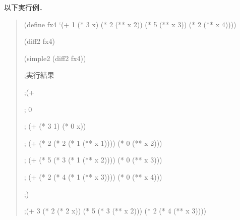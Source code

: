 以下実行例．
\begin{quote}
  
  (define fx4 `(+ 1 (* 3 x) (* 2 (** x 2)) (* 5 (** x 3)) (* 2 (** x 4))))
  
  (diff2 fx4)
  
  (simple2 (diff2 fx4))
  
  ;実行結果
  
  ;(+
  
  ; 0
  
  ; (+ (* 3 1) (* 0 x))
  
  ; (+ (* 2 (* 2 (* 1 (** x 1)))) (* 0 (** x 2)))
  
  ; (+ (* 5 (* 3 (* 1 (** x 2)))) (* 0 (** x 3)))
  
  ; (+ (* 2 (* 4 (* 1 (** x 3)))) (* 0 (** x 4)))
  
  ;)
  
  ;(+ 3 (* 2 (* 2 x)) (* 5 (* 3 (** x 2))) (* 2 (* 4 (** x 3))))

\end{quote}
